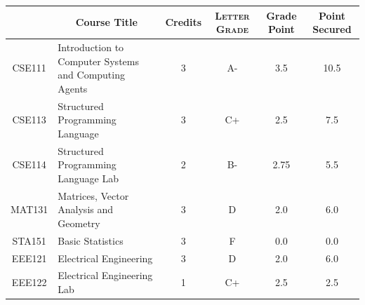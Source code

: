 \documentclass[11pt]{article}
\newcommand*{\numtwo}[1]{\pgfmathprintnumber[
                    fixed, precision=2, fixed zerofill=true]{#1}}
\begin{document}
                \begin{center}
                    \renewcommand{\arraystretch}{1.08}
                    
                \begin{tabular}{|c|l|c|>{\scshape}c|c|c|}
                \hline  \rule[-1ex]{0pt}{3.5ex} {\centering{\bf Course Code}} &  \multicolumn{1}{c|}{\textbf{Course Title}}  & {\bf Credits} & {\bf Letter Grade} & {\bf Grade Point} & {\bf Point Secured}  \\ 
                \hline   CSE111 &  Introduction to Computer Systems and Computing Agents		 & 3 & A- & 3.5 & 10.5 \\ %
                \hline   CSE113 &  Structured Programming Language		 & 3 & C+ & 2.5 & 7.5 \\ %
                \hline   CSE114 &  Structured Programming Language Lab		 & 2 & B- & 2.75 & 5.5 \\ %
                \hline   MAT131 &  Matrices, Vector Analysis and Geometry		 & 3 & D & 2.0 & 6.0 \\ %
                \hline   STA151 &  Basic Statistics		 & 3 & F & 0.0 & 0.0 \\ %
                \hline   EEE121 &  Electrical Engineering		 & 3 & D & 2.0 & 6.0 \\ %
                \hline   EEE122 &  Electrical Engineering Lab		 & 1 & C+ & 2.5 & 2.5 \\ %

\hline                %
                \end{tabular}
                \end{center}
                \renewcommand{\arraystretch}{1.03}
\end{document}
